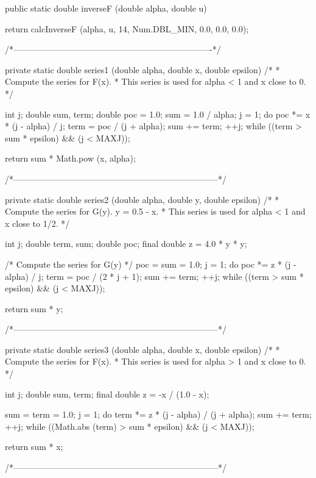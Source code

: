 \begin{code}

   public static double inverseF (double alpha, double u)\begin{hide} {
      return calcInverseF (alpha, u, 14, Num.DBL_MIN, 0.0, 0.0, 0.0);
   }

   /*----------------------------------------------------------------------*/

   private static double series1 (double alpha, double x, double epsilon)
   /*
    * Compute the series for F(x).
    * This series is used for alpha < 1 and x close to 0.
    */
   {
      int j;
      double sum, term;
      double poc = 1.0;
      sum = 1.0 / alpha;
      j = 1;
      do {
         poc *= x * (j - alpha) / j;
         term = poc / (j + alpha);
         sum += term;
         ++j;
      } while ((term > sum * epsilon) && (j < MAXJ));

      return sum * Math.pow (x, alpha);
   }


   /*------------------------------------------------------------------------*/

   private static double series2 (double alpha, double y, double epsilon)
   /*
    * Compute the series for G(y).   y = 0.5 - x.
    * This series is used for alpha < 1 and x close to 1/2.
    */
   {
      int j;
      double term, sum;
      double poc;
      final double z = 4.0 * y * y;

      /* Compute the series for G(y) */
      poc = sum = 1.0;
      j = 1;
      do {
         poc *= z * (j - alpha) / j;
         term = poc / (2 * j + 1);
         sum += term;
         ++j;
      } while ((term > sum * epsilon) && (j < MAXJ));

      return sum * y;
   }


   /*------------------------------------------------------------------------*/

   private static double series3 (double alpha, double x, double epsilon)
   /*
    * Compute the series for F(x).
    * This series is used for alpha > 1 and x close to 0.
    */
   {
      int j;
      double sum, term;
      final double z = -x / (1.0 - x);

      sum = term = 1.0;
      j = 1;
      do {
         term *= z * (j - alpha) / (j + alpha);
         sum += term;
         ++j;
      } while ((Math.abs (term) > sum * epsilon) && (j < MAXJ));

      return sum * x;
   }


   /*------------------------------------------------------------------------*/


\end{hide}
\end{code}

